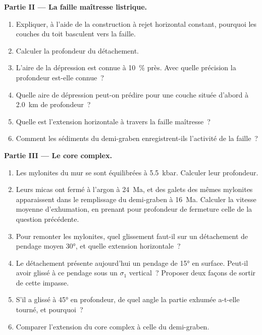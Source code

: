 \begin{problem}
\medskip\noindent\textbf{Partie II --- La faille maîtresse listrique.}
\begin{enumerate}[resume]
  \item Expliquer, à l'aide de la construction à rejet horizontal constant, pourquoi les couches du
        toit basculent vers la faille.
  \item Calculer la profondeur du détachement.
  \item L'aire de la dépression est connue à \qty{10}{\percent} près. Avec quelle précision
        la profondeur est-elle connue~?
  \item Quelle aire de dépression peut-on prédire pour une couche située d'abord à \qty{2.0}{km}
        de profondeur~?
  \item Quelle est l'extension horizontale à travers la faille maîtresse~?
  \item Comment les sédiments du demi-graben enregistrent-ils l'activité de la
        faille~?
\end{enumerate}

\medskip\noindent\textbf{Partie III --- Le core complex.}
\begin{enumerate}[resume]
  \item Les mylonites du mur se sont équilibrées à \qty{5.5}{kbar}. Calculer
        leur profondeur.
  \item Leurs micas ont fermé à l'argon à \qty{24}{Ma}, et des galets des mêmes
        mylonites apparaissent dans le remplissage du demi-graben à \qty{16}{Ma}. Calculer la
        vitesse moyenne d'exhumation, en prenant pour profondeur de fermeture celle de la
        question précédente.
  \item Pour remonter les mylonites, quel glissement faut-il sur un détachement
        de pendage moyen \ang{30}, et quelle extension horizontale~?
  \item Le détachement présente aujourd'hui un pendage de \ang{15} en surface. Peut-il avoir
        glissé à ce pendage sous un $\sigma_1$ vertical~? Proposer deux façons de sortir de cette impasse.
  \item S'il a glissé à \ang{45} en profondeur, de quel angle la
        partie exhumée a-t-elle tourné, et pourquoi~?
  \item Comparer l'extension du core complex à celle du
        demi-graben.
\end{enumerate}


\end{problem}
